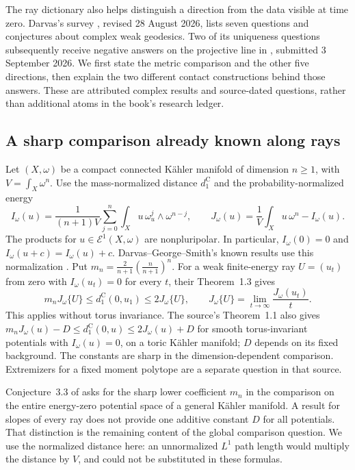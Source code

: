 The ray dictionary also helps distinguish a direction from the data
visible at time zero. Darvas's survey \cite{Darvas26MetricSurveyV2},
revised 28 August 2026, lists seven questions and conjectures about
complex weak geodesics. Two of its uniqueness questions subsequently
receive negative answers on the projective line in
\cite{Xiao26NonuniquenessV1}, submitted 3 September 2026.
We first state the metric comparison and the other five directions,
then explain the two different contact constructions behind those
answers. These are attributed complex results and source-dated
questions, rather than additional atoms in the book's research ledger.

\subsection{A sharp comparison already known along rays}

Let $(X,\omega)$ be a compact connected K\"ahler manifold of
dimension $n\geq1$, with $V=\int_X\omega^n$.
Use the mass-normalized distance $d_1^{\mathrm C}$ and the
probability-normalized energy
\[
\tag{65.60}\label{eq:rf-survey-energy-J}
 I_\omega(u)=\frac{1}{(n+1)V}\sum_{j=0}^n
       \int_Xu\,\omega_u^j\wedge\omega^{n-j},\qquad
 J_\omega(u)=\frac1V\int_Xu\,\omega^n-I_\omega(u).
\]
The products for $u\in\mathcal E^1(X,\omega)$ are
nonpluripolar. In particular, $I_\omega(0)=0$ and
$I_\omega(u+c)=I_\omega(u)+c$.
Darvas--George--Smith's known results use this normalization
\cite{DarvasGeorgeSmith21JV1}. Put
$m_n=\frac{2}{n+1}(\frac{n}{n+1})^n$.
For a weak finite-energy ray $U=(u_t)$ from zero with
$I_\omega(u_t)=0$ for every $t$, their Theorem~1.3 gives
\[
\tag{65.61}\label{eq:rf-survey-radial-J}
 m_n J_\omega\{U\}\leq d_1^{\mathrm C}(0,u_1)
                  \leq2J_\omega\{U\},\qquad
 J_\omega\{U\}=\lim_{t\to\infty}\frac{J_\omega(u_t)}t.
\]
This applies without torus invariance. The source's Theorem~1.1
also gives $m_nJ_\omega(u)-D\leq d_1^{\mathrm C}(0,u)
\leq2J_\omega(u)+D$ for smooth torus-invariant potentials
with $I_\omega(u)=0$, on a toric K\"ahler manifold; $D$
depends on its fixed background. The constants are sharp in
the dimension-dependent comparison. Extremizers for a fixed
moment polytope are a separate question in that source.

Conjecture~3.3 of \cite{Darvas26MetricSurveyV2} asks for the
sharp lower coefficient $m_n$ in the comparison on the entire
energy-zero potential space of a general K\"ahler manifold.
A result for slopes of every ray does not provide one additive
constant $D$ for all potentials. That distinction is the remaining
content of the global comparison question. We use the normalized
distance here: an unnormalized $L^1$ path length would multiply
the distance by $V$, and could not be substituted in these formulas.

